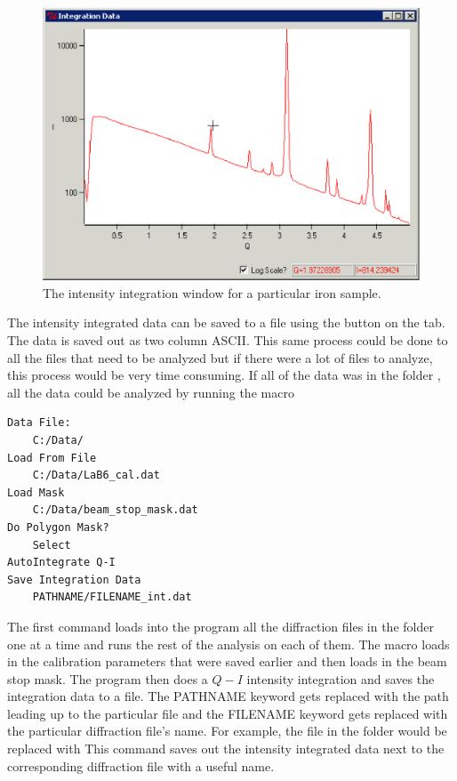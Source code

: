 \begin{figure}
    \centering
    \includegraphics[scale=.75]
    {figures/iron_intensity.eps}
    \caption{The intensity integration window for 
    a particular iron sample.}
    \label{iron_intensity}
\end{figure}

The intensity integrated data can be saved to a file
using the  button on the  tab. 
The data is saved out as two column ASCII. This same 
process could be done to all the files that need to be 
analyzed but if there were a lot of files to analyze, this 
process would be very time consuming. If all of the data was in 
the folder , all the data could be analyzed by 
running the macro
\begin{lstlisting}[caption={'A macro to automate the 
    analysis'}]
Data File:
	C:/Data/
Load From File
    C:/Data/LaB6_cal.dat
Load Mask
    C:/Data/beam_stop_mask.dat
Do Polygon Mask?
    Select
AutoIntegrate Q-I
Save Integration Data
    PATHNAME/FILENAME_int.dat
\end{lstlisting}
The first command loads into the program all the
diffraction files in the folder 
one at a time and runs the rest of the analysis on
each of them. The macro loads in the calibration parameters
that were saved earlier and then loads in the beam stop 
mask. The program then does a $Q-I$ intensity integration and 
saves the integration data to a file. The PATHNAME keyword gets
replaced with the path leading up to the particular 
file and the FILENAME keyword gets replaced with 
the particular diffraction file's name. For example, the file
 in
the folder  would
be replaced with
This command saves out the intensity integrated data next 
to the corresponding diffraction file with a useful name.

